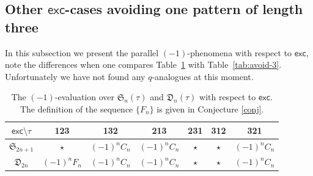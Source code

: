 \documentclass[12pt,reqno]{amsart}
\numberwithin{equation}{section}
\theoremstyle{plain}
\theoremstyle{definition}
\def\S{\mathfrak{S}}
\def\D{\mathfrak{D}}
\def\a{\mathfrak{a}}
\def\exc{\mathsf{exc}}
\begin{document}



\subsection{\texorpdfstring{Other $\exc$-cases avoiding one pattern of length three}{}}
In this subsection we present the parallel $(-1)$-phenomena with respect to $\exc$, note the differences when one compares Table~\ref{tab:exc-avoid3} with Table~\ref{tab:avoid-3}. Unfortunately we have not found any $q$-analogues at this moment.

\begin{table}[tbp]\caption{The $(-1)$-evaluation over $\S_n(\tau)$ and $\D_n(\tau)$ with respect to $\exc$. The definition of the sequence $\{F_n\}$ is given in Conjecture \ref{conj}.}
\label{tab:exc-avoid3}
\centering
\begin{tabular}{ccccccc}
\hline
$\exc\setminus \tau$ &123 &132 &213 &231 &312 &321\\
\hline
$\S_{2n+1}$ &$\star$ &$(-1)^nC_n$ &$(-1)^nC_n$ &$\star$ &$\star$ &$(-1)^nC_n$ \\
$\D_{2n}$ &$(-1)^nF_n$ &$(-1)^nC_n$ &$(-1)^nC_n$ &$\star$ &$\star$ &$(-1)^nC_n$ \\
\hline
\end{tabular}
\end{table}
\end{document}
